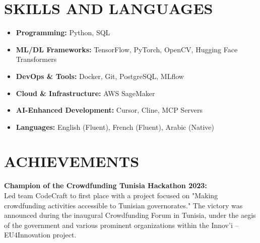 \documentclass[a4paper,9pt]{extarticle}
\begin{document}
\section*{SKILLS AND LANGUAGES}
\begin{itemize}
    \item \textbf{Programming:} Python, SQL
    \item \textbf{ML/DL Frameworks:} TensorFlow, PyTorch, OpenCV, Hugging Face Transformers
    \item \textbf{DevOps \& Tools:} Docker, Git, PostgreSQL, MLflow
    \item \textbf{Cloud \& Infrastructure:} AWS SageMaker
    \item \textbf{AI-Enhanced Development:} Cursor, Cline, MCP Servers
    \item \textbf{Languages:} English (Fluent), French (Fluent), Arabic (Native)
\end{itemize}



\section*{ACHIEVEMENTS}
\textbf{Champion of the Crowdfunding Tunisia Hackathon 2023:}\\ Led team CodeCraft to first place with a project focused on "Making crowdfunding activities accessible to Tunisian governorates." The victory was announced during the inaugural Crowdfunding Forum in Tunisia, under the aegis of the government and various prominent organizations within the Innov’i – EU4Innovation project. \\


\end{document}
